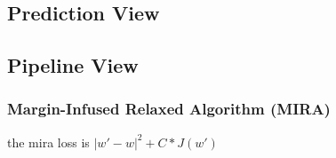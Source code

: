 \subsection{Prediction View}



\subsection{Pipeline View}

\subsubsection{Margin-Infused Relaxed Algorithm (MIRA)}
the mira loss is $|w' - w|^2 + C * J(w')$
